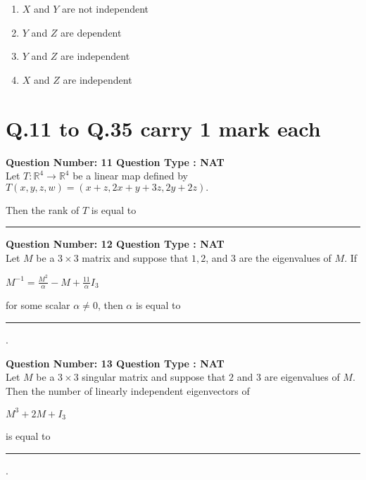 \begin{enumerate}
    \item $ X $ and $ Y $ are not independent
    \item $ Y $ and $ Z $ are dependent
    \item $ Y $ and $ Z $ are independent
    \item $ X $ and $ Z $ are independent
\end{enumerate}
\bigskip
\section*{Q.11 to Q.35 carry 1 mark each}
\item \textbf{Question Number: 11 Question Type : NAT}\\
Let $ T : \mathbb{R}^4 \to \mathbb{R}^4 $ be a linear map defined by \\

$T(x, y, z, w) = (x + z, 2x + y + 3z, 2y + 2z).$

Then the rank of $ T $ is equal to \rule{1cm}{0.15mm}
\bigskip
\item \textbf{Question Number: 12 Question Type : NAT}\\
Let $ M $ be a $ 3 \times 3 $ matrix and suppose that $ 1, 2 $, and $ 3 $ are the eigenvalues of $ M $. If 

$M^{-1} = \frac{M^2}{\alpha} - M + \frac{11}{\alpha} I_3$

for some scalar $ \alpha \neq 0 $, then $ \alpha $ is equal to \rule{1cm}{0.15mm}.
\bigskip
\item \textbf{Question Number: 13 Question Type : NAT}\\
Let $ M $ be a $ 3 \times 3 $ singular matrix and suppose that $ 2 $ and $ 3 $ are eigenvalues of $ M $. Then the number of linearly independent eigenvectors of 

$M^3 + 2M + I_3$

is equal to \rule{1cm}{0.15mm}.

